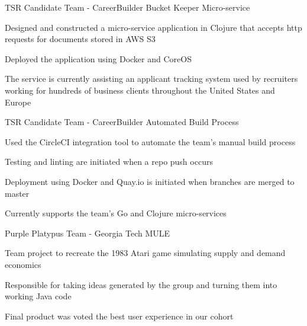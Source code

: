 

\begin{cventries}

  \cventry
  	{TSR Candidate Team - CareerBuilder} %
    {Bucket Keeper Micro-service} %
    {} %
    {} %
    {
      \begin{cvitems} %
        \item {Designed and constructed a micro-service application in Clojure that accepts http requests for documents stored in AWS S3}
      \item {Deployed the application using Docker and CoreOS } 
      \item {The service is currently assisting an applicant tracking system used by recruiters working for hundreds of business clients throughout the United States and Europe} 
      \end{cvitems}
    }

  \cventry
   	{TSR Candidate Team - CareerBuilder} %
    {Automated Build Process} %
    {} %
    {} %
    {
      \begin{cvitems} %
        \item {Used the CircleCI integration tool to automate the team's manual build process}
        \item {Testing and linting are initiated when a repo push occurs}
        \item {Deployment using Docker and Quay.io is initiated when branches are merged to master}
        \item {Currently supports the team's Go and Clojure micro-services}
    	\end{cvitems}
	}
  \cventry
    {Purple Platypus Team - Georgia Tech} %
    {MULE} %
    {} %
    {} %
    {
      \begin{cvitems} %
        \item {Team project to recreate the 1983 Atari game simulating supply and demand economics}
        \item {Responsible for taking ideas generated by the group and turning them into working Java code}
        \item {Final product was voted the best user experience in our cohort}
      \end{cvitems}
    }
    

\end{cventries}
